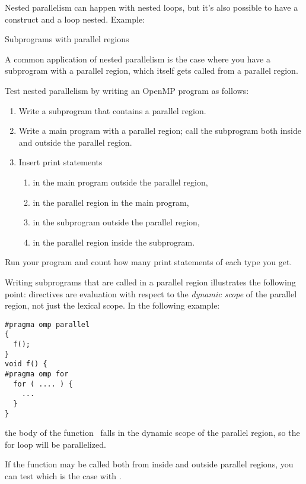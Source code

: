Nested parallelism can happen with nested loops,
but it's also possible to have a  construct
and a loop nested.
Example:

 {Subprograms with parallel regions}

A common application of nested parallelism is the case
where you have a subprogram with a parallel region,
which itself gets called from a parallel region.

\begin{exercise}
  Test nested parallelism by writing an OpenMP program as follows:
  \begin{enumerate}
  \item Write a subprogram that contains a parallel region.
  \item\label{ex:nest:sub} Write a main program with a parallel region; call the subprogram both inside and outside the parallel region.
    \item Insert print statements 
      \begin{enumerate}
      \item in the main program outside the parallel region,
      \item in the parallel region in the main program,
      \item\label{ex:nest:sub:sub} in the subprogram outside the parallel region,
      \item in the parallel region inside the subprogram.
      \end{enumerate}
  \end{enumerate}
  Run your program and count how many print statements of each type you get.
\end{exercise}

Writing subprograms that are called in a parallel region illustrates
the following point: directives are evaluation with respect to the
\emph{dynamic scope} of the
parallel region, not just the lexical scope. In the following example:
\begin{lstlisting}
#pragma omp parallel
{
  f();
}
void f() {
#pragma omp for
  for ( .... ) {
    ...
  }
}
\end{lstlisting}
the body of the function~ falls in the dynamic scope of the
parallel region, so the for loop will be parallelized.

If the function may be called both from inside and outside parallel
regions, you can test which is the case with .

